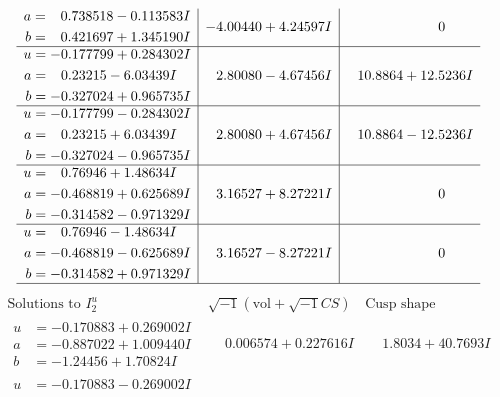 \documentclass[1p]{elsarticle_modified}
\theoremstyle{definition}
\newcommand{\I}{\sqrt{-1}}
\begin{document}
$$\begin{array}{c|c|c}
\begin{aligned}
a &= \phantom{-}0.738518 - 0.113583 I \\
b &= \phantom{-}0.421697 + 1.345190 I\end{aligned}
 & -4.00440 + 4.24597 I & \phantom{-0.000000 } 0 \\ \hline\begin{aligned}
u &= -0.177799 + 0.284302 I \\
a &= \phantom{-}0.23215 - 6.03439 I \\
b &= -0.327024 + 0.965735 I\end{aligned}
 & \phantom{-}2.80080 - 4.67456 I & \phantom{-}10.8864 + 12.5236 I \\ \hline\begin{aligned}
u &= -0.177799 - 0.284302 I \\
a &= \phantom{-}0.23215 + 6.03439 I \\
b &= -0.327024 - 0.965735 I\end{aligned}
 & \phantom{-}2.80080 + 4.67456 I & \phantom{-}10.8864 - 12.5236 I \\ \hline\begin{aligned}
u &= \phantom{-}0.76946 + 1.48634 I \\
a &= -0.468819 + 0.625689 I \\
b &= -0.314582 - 0.971329 I\end{aligned}
 & \phantom{-}3.16527 + 8.27221 I & \phantom{-0.000000 } 0 \\ \hline\begin{aligned}
u &= \phantom{-}0.76946 - 1.48634 I \\
a &= -0.468819 - 0.625689 I \\
b &= -0.314582 + 0.971329 I\end{aligned}
 & \phantom{-}3.16527 - 8.27221 I & \phantom{-0.000000 } 0\\
 \hline 
 \end{array}$$\newpage$$\begin{array}{c|c|c}  
\text{Solutions to }I^u_{2}& \I (\text{vol} + \sqrt{-1}CS) & \text{Cusp shape}\\
 \hline 
\begin{aligned}
u &= -0.170883 + 0.269002 I \\
a &= -0.887022 + 1.009440 I \\
b &= -1.24456 + 1.70824 I\end{aligned}
 & \phantom{-}0.006574 + 0.227616 I & \phantom{-}1.8034 + 40.7693 I \\ \hline\begin{aligned}
u &= -0.170883 - 0.269002 I \\

\end{aligned}
\end{array}$$
\end{document}
